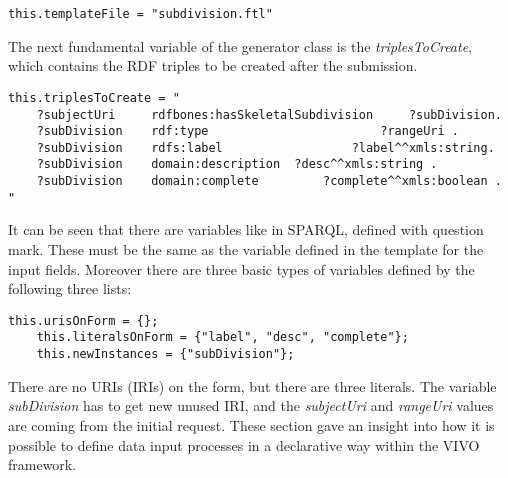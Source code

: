 \begin{lstlisting}[captionpos=b, caption= Form defintion in Java, label=skullJSON, belowskip=1em, aboveskip=2em,
basicstyle=\footnotesize,frame=single]
	this.templateFile = "subdivision.ftl"
\end{lstlisting}

The next fundamental variable of the generator class is the \textit{triplesToCreate}, which contains the RDF triples to be created after the submission.

\begin{lstlisting}[captionpos=b, caption= RDF Triples to create, label=skullJSON, belowskip=1em, aboveskip=2em,
basicstyle=\footnotesize,frame=single]
this.triplesToCreate = "
	?subjectUri		rdfbones:hasSkeletalSubdivision		?subDivision.
	?subDivision	rdf:type						?rangeUri .
	?subDivision	rdfs:label					?label^^xmls:string.
	?subDivision	domain:description	?desc^^xmls:string .
	?subDivision	domain:complete			?complete^^xmls:boolean . "
\end{lstlisting}

It can be seen that there are variables like in SPARQL, defined with question mark. These must be the same as the variable defined in the template for the input fields. Moreover there are three basic types of variables defined by the following three lists:

\begin{lstlisting}[captionpos=b, caption= Variable type definition, label=skullJSON, belowskip=1em, aboveskip=2em,
basicstyle=\footnotesize,frame=single]
	this.urisOnForm = {};
	this.literalsOnForm	= {"label", "desc", "complete"};
	this.newInstances = {"subDivision"};
\end{lstlisting}

There are no URIs (IRIs) on the form, but there are three literals. The variable \textit{subDivision} has to get new unused IRI, and the \textit{subjectUri} and \textit{rangeUri} values are coming from the initial request.
These section gave an insight into how it is possible to define data input processes in a declarative way within the VIVO framework. 


